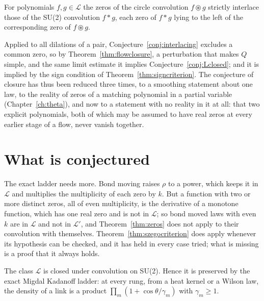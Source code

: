 \begin{conjecture}[interlacing]\label{conj:interlacing}
For polynomials $f,g\in\mathcal L$ the zeros of the circle convolution $f\circledast g$ strictly interlace those of the SU(2) convolution $f*g$, each zero of $f*g$ lying to the left of the corresponding zero of $f\circledast g$.
\end{conjecture}

Applied to all dilations of a pair, Conjecture~\ref{conj:interlacing} excludes a common zero, so by Theorem~\ref{thm:flowclosure}, a perturbation that makes $Q$ simple, and the same limit estimate it implies Conjecture~\ref{conj:Lclosed}; and it is implied by the sign condition of Theorem~\ref{thm:signcriterion}. The conjecture of closure has thus been reduced three times, to a smoothing statement about one law, to the reality of zeros of a matching polynomial in a partial variable (Chapter~\ref{ch:theta}), and now to a statement with no reality in it at all: that two explicit polynomials, both of which may be assumed to have real zeros at every earlier stage of a flow, never vanish together.

\section{What is conjectured}

The exact ladder needs more. Bond moving raises $\rho$ to a power, which keeps it in $\mathcal L$ and multiplies the multiplicity of each zero by $k$. But a function with two or more distinct zeros, all of even multiplicity, is the derivative of a monotone function, which has one real zero and is not in $\mathcal L$; so bond moved laws with even $k$ are in $\mathcal L$ and not in $\mathcal L'$, and Theorem~\ref{thm:zeros} does not apply to their convolution with themselves. Theorem~\ref{thm:szegocriterion} does apply whenever its hypothesis can be checked, and it has held in every case tried; what is missing is a proof that it always holds.

\begin{conjecture}\label{conj:Lclosed}
The class $\mathcal L$ is closed under convolution on SU(2). Hence it is preserved by the exact Migdal Kadanoff ladder: at every rung, from a heat kernel or a Wilson law, the density of a link is a product $\prod_m(1+\cos\theta/\gamma_m)$ with $\gamma_m\ge1$.
\end{conjecture}

